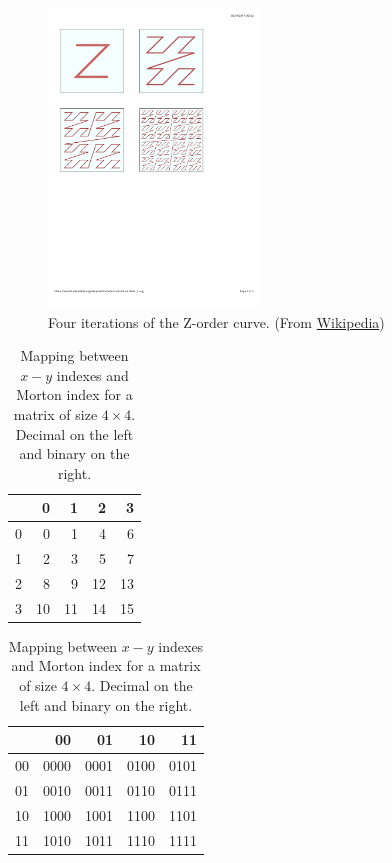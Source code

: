 \documentclass{article}
\begin{document}
\begin{figure}[htb]
  \begin{center}
    \includegraphics[width=0.5\textwidth]{mortonorder}
    \caption{Four iterations of the Z-order curve. (From
      \href{https://en.wikipedia.org/wiki/Z-order_curve}{Wikipedia})}
    \label{fig:morton}
  \end{center}
\end{figure}
\clearpage
\begin{table}[htb]
  \begin{tabular}{l|rrrr}
    &    0 &  1 &  2 &  3 \\
    \hline
    0 & 0 & 1 & 4 & 6 \\
    1 & 2 & 3 & 5 & 7 \\
    2 & 8 & 9 & 12 & 13 \\
    3 & 10 & 11 & 14 & 15 \\
  \end{tabular}\quad
  \begin{tabular}{l|rrrr}
    &   00 & 01 & 10 & 11 \\
    \hline
    00 & 0000 & 0001 & 0100 & 0101 \\
    01 & 0010 & 0011 & 0110 & 0111 \\
    10 & 1000 & 1001 & 1100 & 1101 \\
    11 & 1010 & 1011 & 1110 & 1111 \\
  \end{tabular}
  \caption{Mapping between $x-y$ indexes and Morton index for a matrix
    of size $4\times 4$. Decimal on the left and binary on the right.}
  \label{tab:morton}
\end{table}
\end{document}
